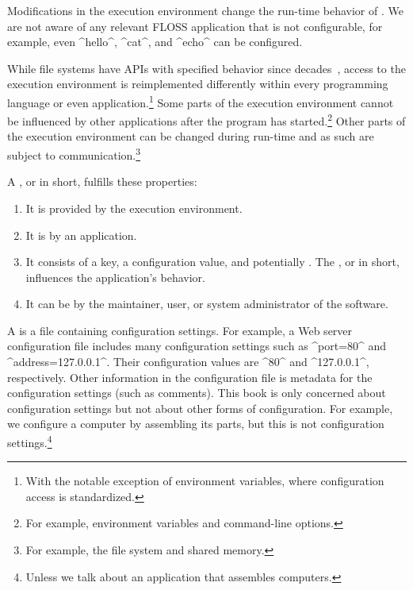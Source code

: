 Modifications in the execution environment change the run-time behavior of .
We are not aware of any relevant FLOSS application that is not configurable, for example, even ^hello^, ^cat^, and ^echo^ can be configured.

While file systems have APIs with specified behavior since decades~\cite{morgan1984specification,sandberg1985nfs}, access to the execution environment is reimplemented differently within every programming language or even application.\footnote{
With the notable exception of environment variables, where configuration access is standardized.}
Some parts of the execution environment cannot be influenced by other applications after the program has started.\footnote{For example, environment variables and command-line options.}
Other parts of the execution environment can be changed during run-time and as such are subject to  communication.\footnote{For example, the file system and shared memory.}

\begin{definition}
\label{def:configuration-setting}
A ,
or  in short,
fulfills these properties:
\begin{enumerate}
\item
It is provided by the execution environment.
\item
It is  by an application.
\item
It consists of a key, a configuration value, and potentially .
The , or  in short, influences the application's behavior.
\item
It can be  by the maintainer, user, or system administrator of the software.
\end{enumerate}
\end{definition}

A  is a file containing configuration settings.
For example, a Web server configuration file includes many configuration settings such as ^port=80^ and ^address=127.0.0.1^.
Their configuration values are ^80^ and ^127.0.0.1^, respectively.
Other information in the configuration file is metadata for the configuration settings (such as comments).
This book is only concerned about configuration settings but not about other forms of configuration.
For example, we configure a computer by assembling its parts, but this is not configuration settings.\footnote{Unless we talk about an application that assembles computers.}

